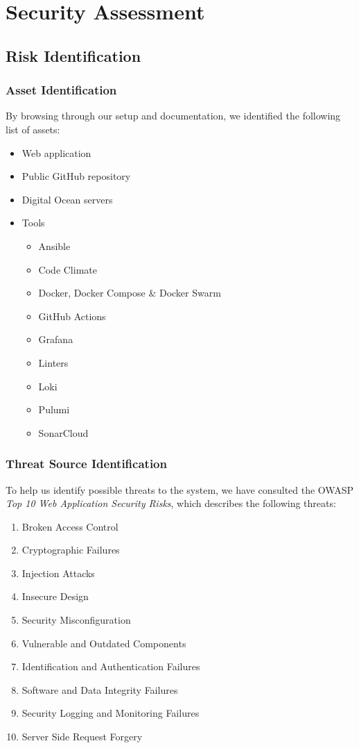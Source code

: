 \section{Security Assessment}
\label{appendix:securityassesment}
\subsection{Risk Identification}
\subsubsection{Asset Identification}
By browsing through our setup and documentation, we identified the following list of assets:
\begin{itemize}
    \item Web application
    \item Public GitHub repository
    \item Digital Ocean servers
    \item Tools
    \begin{itemize}
        \item Ansible
        \item Code Climate
        \item Docker, Docker Compose \& Docker Swarm
        \item GitHub Actions
        \item Grafana
        \item Linters
        \item Loki
        \item Pulumi
        \item SonarCloud
    \end{itemize}
\end{itemize}
\subsubsection{Threat Source Identification}
To help us identify possible threats to the system, we have consulted the OWASP \textit{Top 10 Web Application Security Risks}\cite*{OWASP}, which describes the following threats:
\begin{enumerate}
    \item Broken Access Control
    \item Cryptographic Failures
    \item Injection Attacks
    \item Insecure Design
    \item Security Misconfiguration
    \item Vulnerable and Outdated Components
    \item Identification and Authentication Failures
    \item Software and Data Integrity Failures
    \item Security Logging and Monitoring Failures
    \item Server Side Request Forgery
\end{enumerate}
